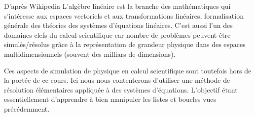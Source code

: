 
D'après Wikipedia \og{}L’algèbre linéaire est la branche des mathématiques
qui s'intéresse aux espaces vectoriels et aux transformations linéaires,
formalisation générale des théories des systèmes d'équations linéaires.\fg{}
C'est aussi l'un des domaines clefs du calcul scientifique car nombre de
problèmes peuvent être simulés/résolus grâce à la représentation de
grandeur physique dans des espaces multidimensionnels
(souvent des milliars de dimensions).

Ces aspects de simulation de physique en calcul scientifique sont
toutefois hors de la portée de ce cours. Ici nous nous contenterons
d'utiliser une méthode de résolution élémentaires appliquée à
des systèmes d'équations. L'objectif étant essentiellement d'apprendre
à bien manipuler les listes et boucles vues précédemment.

